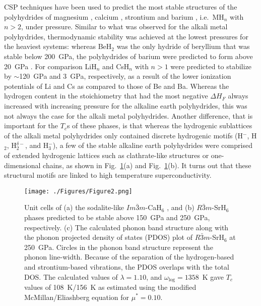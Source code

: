 \documentclass[12pt,letterpaper,oneside]{article}
\begin{document}
CSP techniques have been used to predict the most stable structures of the polyhydrides of magnesium \cite{Lonie:2012,Feng:2015a}, calcium \cite{Wang:2012}, strontium \cite{Hooper:2013,Wang:2015a} and barium \cite{Hooper:2012b}, i.e.\ MH$_n$ with $n>2$, under pressure. Similar to what was observed for the alkali metal polyhydrides, thermodynamic stability was achieved at the lowest pressures for the heaviest systems: whereas BeH$_2$ was the only hydride of beryllium that was stable below 200~GPa, the polyhydrides of barium were predicted to form above 20~GPa \cite{Hooper:2012b}. For comparison LiH$_n$ \cite{Zurek:2009c} and CsH$_n$ \cite{Shamp:2012} with $n>1$ were predicted to stabilize by $\sim$120~GPa and 3~GPa, respectively, as a result of the lower ionization potentials of Li and Cs as compared to those of Be and Ba. Whereas the hydrogen content in the stoichiometry that had the most negative $\Delta H_F$ always increased with increasing pressure for the alkaline earth polyhydrides, this was not always the case for the alkali metal polyhydrides. Another difference, that is important for the $T_c$s of these phases, is that whereas the hydrogenic sublattices of the alkali metal polyhydrides only contained discrete hydrogenic motifs (H$^-$, H$_2$, H$_2^{\delta-}$, and H$_3^-$), a few of the stable alkaline earth polyhydrides were comprised of extended hydrogenic lattices such as clathrate-like structures or one-dimensional chains, as shown in Fig.\ \ref{fig:Group2}(a) and Fig.\ \ref{fig:Group2}(b). It turns out that these structural motifs are linked to high temperature superconductivity. 

\begin{figure}[h!]
\begin{center}
\texttt{[image: ./Figures/Figure2.png]}
\end{center}
\caption{Unit cells of (a) the sodalite-like $Im\bar{3}m$-CaH$_6$ \cite{Wang:2012}, and (b) $R\bar{3}m$-SrH$_6$ \cite{Hooper:2013,Wang:2015a} phases predicted to be stable above 150~GPa and 250~GPa, respectively. (c) The calculated phonon band structure along with the phonon projected density of states (PDOS) plot of $R\bar{3}m$-SrH$_6$ at 250~GPa. Circles in the phonon band structure represent the phonon line-width. Because of the separation of the hydrogen-based and strontium-based vibrations, the PDOS overlaps with the total DOS. The calculated values of $\lambda=1.10$, and $\omega_\text{log}=1358$~K gave $T_c$ values of 108~K/156~K as estimated using the modified McMillan/Eliashberg equation for $\mu^*=0.10$.}
\label{fig:Group2}
\end{figure}
\end{document}
